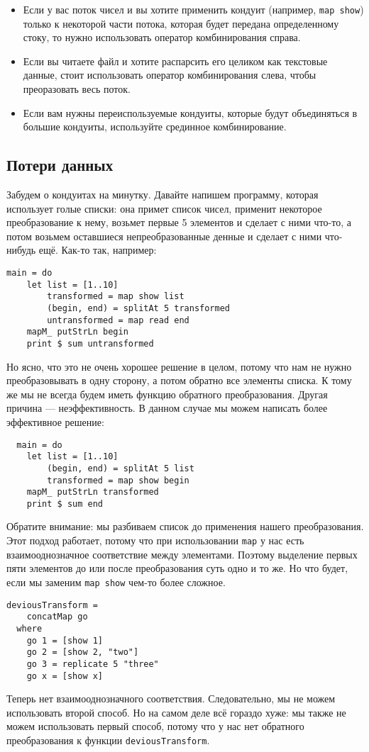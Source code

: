 {\begin{itemize}   
\item Если у вас поток чисел и вы хотите применить кондуит (например, 
\lstinline'map show') только к некоторой части потока, которая будет передана 
определенному стоку, то нужно использовать оператор комбинирования справа.
\item Если вы читаете файл и хотите распарсить его целиком как текстовые данные, 
стоит использовать оператор комбинирования слева, чтобы преоразовать весь поток.
\item Если вам нужны переиспользуемые кондуиты, которые будут объединяться в 
большие кондуиты, используйте срединное комбинирование.
\end{itemize}

\subsection{Потери данных} 
Забудем о кондуитах на минутку. Давайте напишем программу, которая использует 
голые списки: она примет список чисел, применит некоторое преобразование к нему,
возьмет первые 5 элементов и сделает с ними что-то, а потом возьмем оставшиеся
непреобразованные денные и сделает с ними что-нибудь ещё. Как-то так, например:
\begin{lstlisting}
main = do
    let list = [1..10]
        transformed = map show list
        (begin, end) = splitAt 5 transformed
        untransformed = map read end
    mapM_ putStrLn begin
    print $ sum untransformed
\end{lstlisting}
Но ясно, что это не очень хорошее решение в целом, потому что нам не нужно 
преобразовывать в одну сторону, а потом обратно все элементы списка. К тому же 
мы не всегда будем иметь функцию обратного преобразования. Другая причина 
--- неэффективность. В данном случае мы можем написать более эффективное решение:
\begin{lstlisting}
  main = do
    let list = [1..10]
        (begin, end) = splitAt 5 list
        transformed = map show begin
    mapM_ putStrLn transformed
    print $ sum end
\end{lstlisting}
Обратите внимание: мы разбиваем список до применения  нашего преобразования. 
Этот подход работает, потому что при использовании \lstinline'map' у нас есть
 взаимооднозначное соответствие между элементами. Поэтому выделение первых пяти 
 элементов до или после преобразования суть одно и то же. Но что будет, если мы 
 заменим \lstinline'map show' чем-то более сложное.
\begin{lstlisting}
deviousTransform =
    concatMap go
  where
    go 1 = [show 1]
    go 2 = [show 2, "two"]
    go 3 = replicate 5 "three"
    go x = [show x]
\end{lstlisting}
Теперь нет взаимооднозначного соответствия. Следовательно, мы не можем 
использовать второй способ. Но на самом деле всё гораздо хуже: мы также не можем 
использовать первый способ, потому что у нас нет обратного преобразования к 
функции \lstinline'deviousTransform'.
 
}
